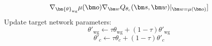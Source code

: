 \begin{algorithm}[h!]
\begin{algorithmic}[1]
\begin{equation*}
\grad_{\bm{\theta}_{\text{wg}}} \mu ({\bm o}) \grad_{{\bm w}} Q_{{\theta}_{\text{c}}} ({\bm s}, {\bm w})
|_{{\bm w} = \mu ({\bm o})} ] 
        \end{equation*}
        \State Update target network parameters:
        \begin{equation*}
        	\theta'_\text{wg} \gets \tau \theta_\text{wg} + (1-\tau)\theta'_\text{wg}
        \end{equation*}
        \begin{equation*}
        	\theta'_{c} \gets \tau \theta_{c} + (1-\tau)\theta'_{c}
        \end{equation*}
    \EndFor
\EndFor
\end{algorithmic}
\end{algorithm}


